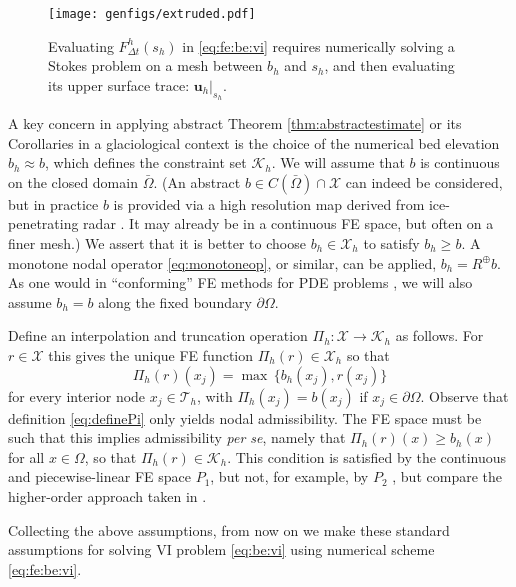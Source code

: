 \documentclass[hidelinks,onefignum,onetabnum,final]{siamart220329}  %
\newcommand{\bu}{\mathbf{u}}
\newcommand{\cK}{\mathcal{K}}
\newcommand{\cT}{\mathcal{T}}
\newcommand{\cX}{\mathcal{X}}
\begin{document}
\begin{figure}[ht]
\begin{center}
\texttt{[image: genfigs/extruded.pdf]}
\end{center}
\caption{Evaluating $F^h_{\Delta t}(s_h)$ in \eqref{eq:fe:be:vi} requires numerically solving a Stokes problem on a mesh between $b_h$ and $s_h$, and then evaluating its upper surface trace: $\bu_h|_{s_h}$.}
\label{fig:fe:operatorvisualization}
\end{figure}

A key concern in applying abstract Theorem \ref{thm:abstractestimate} or its Corollaries in a glaciological context is the choice of the numerical bed elevation $b_h \approx b$, which defines the constraint set $\cK_h$.  We will assume that $b$ is continuous on the closed domain $\bar\Omega$.  (An abstract $b\in C(\bar\Omega) \cap \cX$ can indeed be considered, but in practice $b$ is provided via a high resolution map derived from ice-penetrating radar \cite{Morlighemetal2017}.  It may already be in a continuous FE space, but often on a finer mesh.)  We assert that it is better to choose $b_h \in \cX_h$ to satisfy $b_h\ge b$.  A monotone nodal operator \eqref{eq:monotoneop}, or similar, can be applied, $b_h = R^\oplus b$.  As one would in ``conforming'' FE methods for PDE problems \cite{Elmanetal2014}, we will also assume $b_h=b$ along the fixed boundary $\partial\Omega$.

Define an interpolation and truncation operation $\Pi_h : \cX \to \cK_h$ as follows.  For $r\in\cX$ this gives the unique FE function $\Pi_h(r) \in \cX_h$ so that
\begin{equation}
\Pi_h(r)(x_j) = \max \,\{b_h(x_j), r(x_j)\} \label{eq:definePi}
\end{equation}
for every interior node $x_j \in \cT_h$, with $\Pi_h(x_j)=b(x_j)$ if $x_j\in\partial\Omega$.  Observe that definition \eqref{eq:definePi} only yields nodal admissibility.  The FE space must be such that this implies admissibility \emph{per se}, namely that $\Pi_h(r)(x) \ge b_h(x)$ for all $x \in \Omega$, so that $\Pi_h(r) \in \cK_h$.  This condition is satisfied by the continuous and piecewise-linear FE space $P_1$, but not, for example, by $P_2$ \cite{BuelerFarrell2024}, but compare the higher-order approach taken in \cite{KeithSurowiec2023}.

Collecting the above assumptions, from now on we make these standard assumptions for solving VI problem \eqref{eq:be:vi} using numerical scheme \eqref{eq:fe:be:vi}.
\end{document}
